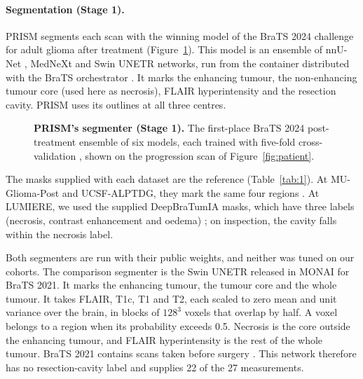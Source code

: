 \documentclass[largeformat]{interact} %
\begin{document}









\paragraph*{Segmentation (Stage 1).} PRISM segments each scan with the winning model \citep{ferreira2024} of the BraTS 2024
challenge for adult glioma after treatment \citep{deverdier2024} (Figure~\ref{fig:segmenter}). This model is an ensemble of nnU-Net
\citep{isensee2021}, MedNeXt \citep{roy2023} and Swin UNETR \citep{hatamizadeh2022} networks, run from the container distributed with the BraTS orchestrator
\citep{kofler2025}. It marks the enhancing tumour, the non-enhancing tumour core (used here as necrosis), FLAIR
hyperintensity and the resection cavity. PRISM uses
its outlines at all three centres. 

\begin{figure}[!htbp]
\centering
{}
\caption{\textbf{PRISM's segmenter (Stage 1).} The first-place BraTS 2024 post-treatment ensemble of six models, each
trained with five-fold cross-validation \citep{ferreira2024}, shown on the progression scan of
Figure~\ref{fig:patient}.}
\label{fig:segmenter}
\end{figure}

The masks supplied with each dataset are the reference (Table~\ref{tab:1}). At MU-Glioma-Post and UCSF-ALPTDG, they mark the same four regions \citep{mahmoud2025,fields2024}. At LUMIERE, we used the supplied DeepBraTumIA masks, which have three labels (necrosis, contrast enhancement and oedema) \citep{suter2022}; on inspection, the cavity falls within
the necrosis label.

Both segmenters are run with their public weights, and neither was tuned on our cohorts. The comparison segmenter
is the Swin UNETR \citep{hatamizadeh2022} released in MONAI \citep{cardoso2022monai} for BraTS 2021. It marks the enhancing tumour, the tumour core
and the whole tumour. It takes FLAIR, T1c, T1 and T2, each
scaled to zero mean and unit variance over the brain, in blocks of $128^3$ voxels that overlap by half. A voxel
belongs to a region when its probability exceeds 0.5. Necrosis is the core outside the enhancing tumour, and FLAIR
hyperintensity is the rest of the whole tumour. BraTS 2021 contains scans taken before surgery \citep{baid2021}. This network therefore has
no resection-cavity label and supplies 22 of the 27 measurements.
\end{document}

